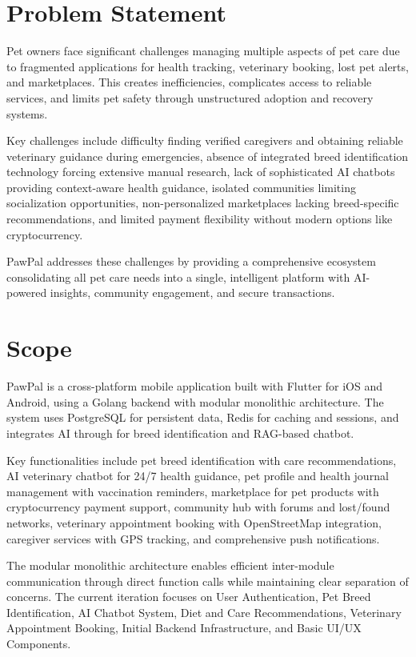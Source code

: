 \section{Problem Statement}

Pet owners face significant challenges managing multiple aspects of pet care due to fragmented applications for health tracking, veterinary booking, lost pet alerts, and marketplaces. This creates inefficiencies, complicates access to reliable services, and limits pet safety through unstructured adoption and recovery systems.

Key challenges include difficulty finding verified caregivers and obtaining reliable veterinary guidance during emergencies, absence of integrated breed identification technology forcing extensive manual research, lack of sophisticated AI chatbots providing context-aware health guidance, isolated communities limiting socialization opportunities, non-personalized marketplaces lacking breed-specific recommendations, and limited payment flexibility without modern options like cryptocurrency.

PawPal addresses these challenges by providing a comprehensive ecosystem consolidating all pet care needs into a single, intelligent platform with AI-powered insights, community engagement, and secure transactions.

\section{Scope}

PawPal is a cross-platform mobile application built with Flutter for iOS and Android, using a Golang backend with modular monolithic architecture. The system uses PostgreSQL for persistent data, Redis for caching and sessions, and integrates AI through for breed identification and RAG-based chatbot.

Key functionalities include pet breed identification with care recommendations, AI veterinary chatbot for 24/7 health guidance, pet profile and health journal management with vaccination reminders, marketplace for pet products with cryptocurrency payment support, community hub with forums and lost/found networks, veterinary appointment booking with OpenStreetMap integration, caregiver services with GPS tracking, and comprehensive push notifications.

The modular monolithic architecture enables efficient inter-module communication through direct function calls while maintaining clear separation of concerns. The current iteration focuses on User Authentication, Pet Breed Identification, AI Chatbot System, Diet and Care Recommendations, Veterinary Appointment Booking, Initial Backend Infrastructure, and Basic UI/UX Components.


